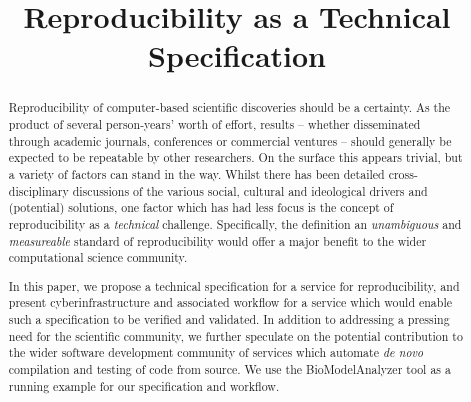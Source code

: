 \documentclass[conference]{IEEEtran}
\begin{document}
%
\title{Reproducibility as a Technical Specification}


\author{
\and
{}
\and
{}
}





\maketitle


\begin{abstract}
Reproducibility of computer-based scientific discoveries should be a
certainty. As the product of several person-years' worth of effort,
results -- whether disseminated through academic journals, conferences
or commercial ventures -- should generally be expected to be
repeatable by other researchers. On the surface this appears trivial,
but a variety of factors can stand in the way. Whilst there has been
detailed cross-disciplinary discussions of the various social,
cultural and ideological drivers and (potential) solutions, one factor
which has had less focus is the concept of reproducibility as a
\emph{technical} challenge. Specifically, the definition an \emph{unambiguous} and 
\emph{measureable} standard of reproducibility would offer a major 
benefit to the wider computational science community.

In this paper, we propose a technical specification for a service for
reproducibility, and present cyberinfrastructure and
associated workflow for a service which would enable such a
specification to be verified and validated. In addition to addressing
a pressing need for the scientific community, we further speculate on
the potential contribution to the wider software development community
of services which automate \emph{de novo} compilation and testing of
code from source. We use the BioModelAnalyzer tool as a running example 
for our specification and workflow. 
\end{abstract}
\end{document}
